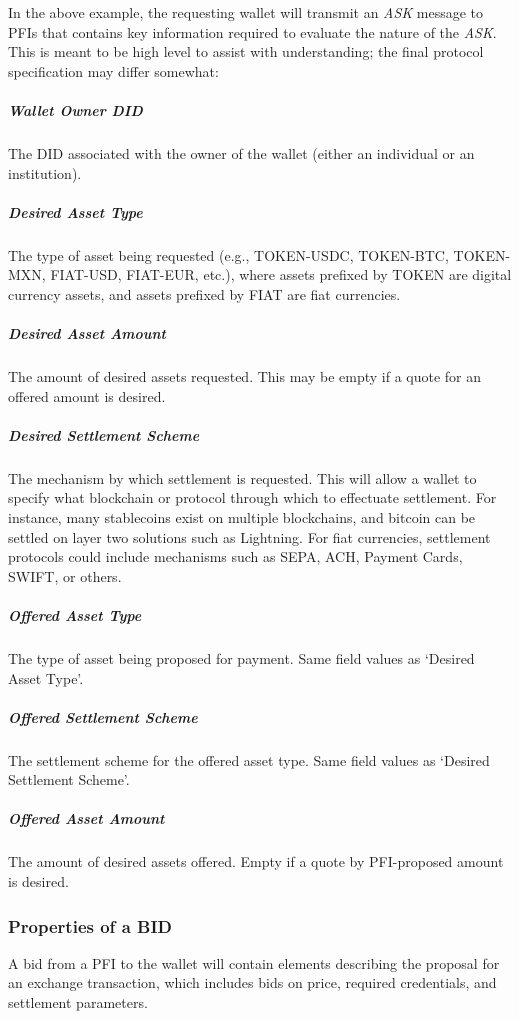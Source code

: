 \documentclass[11pt]{article}
\begin{document}
In the above example, the requesting wallet will transmit an \textit{ASK }message to PFIs that contains key information required to evaluate the nature of the \textit{ASK}. This is meant to be high level to assist with understanding; the final protocol specification may differ somewhat: \ \ 

\subparagraph{Wallet Owner DID}

The DID associated with the owner of the wallet (either an individual or an institution).

\subparagraph{Desired Asset Type}

The type of asset being requested (e.g., TOKEN-USDC, TOKEN-BTC, TOKEN-MXN, FIAT-USD, FIAT-EUR, etc.), where assets prefixed by TOKEN are digital currency assets, and assets prefixed by FIAT are fiat currencies.\textit{ }

\subparagraph{Desired Asset Amount}

The amount of desired assets requested. This may be empty if a quote for an offered amount is desired. 

\subparagraph{Desired Settlement Scheme}

The mechanism by which settlement is requested. This will allow a wallet to specify what blockchain or protocol through which to effectuate settlement. For instance, many stablecoins exist on multiple blockchains, and bitcoin can be settled on layer two solutions such as Lightning. For fiat currencies, settlement protocols could include mechanisms such as SEPA, ACH, Payment Cards, SWIFT, or others.

\subparagraph{Offered Asset Type}

The type of asset being proposed for payment. Same field values as ‘Desired Asset Type’.

\subparagraph{Offered Settlement Scheme}

The settlement scheme for the offered asset type. Same field values as ‘Desired Settlement Scheme’.

\subparagraph{Offered Asset Amount}

The amount of desired assets offered. Empty if a quote by PFI-proposed amount is desired. 

\vspace{1\baselineskip}
\subsubsection{Properties of a BID}

A bid from a PFI to the wallet will contain elements describing the proposal for an exchange transaction, which includes bids on price, required credentials, and settlement parameters. 
\end{document}
